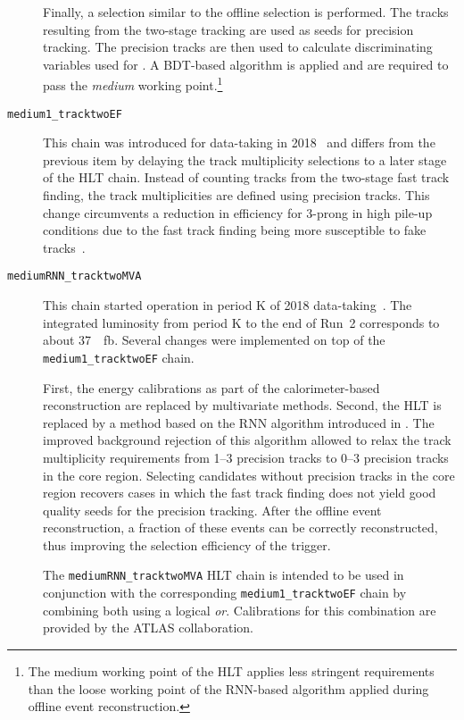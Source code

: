 \begin{description}
  Finally, a \tauhadvis selection similar to the offline \tauhadvis selection is
  performed. The tracks resulting from the two-stage tracking are used as seeds
  for precision tracking. The precision tracks are then used to calculate
  discriminating variables used for \tauid. A BDT-based \tauid algorithm
  is applied and \tauhadvis are required to pass the \emph{medium} working
  point.\footnote{The medium working point of the HLT \tauid applies less
    stringent requirements than the loose working point of the RNN-based \tauid
    algorithm applied during offline event reconstruction.}

\item[\texttt{medium1\_tracktwoEF}]
  This chain was introduced for data-taking in 2018~\cite{ATL-DAQ-PUB-2019-001}
  and differs from the previous item by delaying the track multiplicity
  selections to a later stage of the HLT chain. Instead of counting tracks from
  the two-stage fast track finding, the track multiplicities are defined using
  precision tracks. This change circumvents a reduction in efficiency for
  3-prong \tauhadvis in high pile-up conditions due to the fast track finding
  being more susceptible to fake tracks~\cite{ATL-DAQ-PUB-2019-001}.

\item[\texttt{mediumRNN\_tracktwoMVA}] This chain started operation in period K
  of 2018 data-taking~\cite{ATL-DAQ-PUB-2019-001}. The integrated luminosity
  from period K to the end of Run~2 corresponds to about
  \SI{37}{\per\femto\barn}. Several changes were implemented on top of the
  \texttt{medium1\_tracktwoEF} chain.

  First, the \tauhadvis energy calibrations as part of the calorimeter-based
  \tauhadvis reconstruction are replaced by multivariate methods. Second, the
  HLT \tauid is replaced by a method based on the RNN \tauid algorithm
  introduced in . The improved background rejection of this
  algorithm allowed to relax the track multiplicity requirements from 1--3
  precision tracks to 0--3 precision tracks in the core region. Selecting
  \tauhadvis candidates without precision tracks in the core region recovers
  cases in which the fast track finding does not yield good quality seeds for
  the precision tracking. After the offline event reconstruction, a fraction of
  these events can be correctly reconstructed, thus improving the selection
  efficiency of the trigger.

  The \texttt{mediumRNN\_tracktwoMVA} HLT chain is intended to be used in
  conjunction with the corresponding \texttt{medium1\_tracktwoEF} chain by
  combining both using a logical \emph{or}. Calibrations for this combination
  are provided by the ATLAS collaboration.
\end{description}

